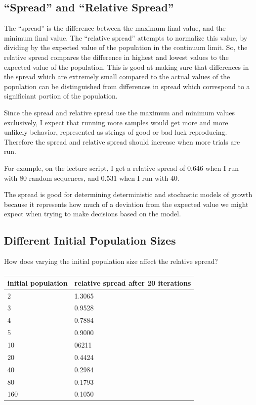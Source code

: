 \documentclass{article}
\begin{document}
\subsection{``Spread'' and ``Relative Spread''}

The ``spread'' is the difference between the maximum final value,
	and the minimum final value.
The ``relative spread'' attempts to normalize this value, by dividing
	by the expected value of the population in the continuum limit.
So, the relative spread compares the difference in highest and lowest values
	to the expected value of the population.
This is good at making sure that differences in the spread which are extremely
	small compared to the actual values of the population can be distinguished
	from differences in spread which correspond to a significiant portion
	of the population.

Since the spread and relative spread use the maximum and minimum values exclusively,
	I expect that running more samples would get more and more unlikely behavior,
	represented as strings of good or bad luck reproducing.
Therefore the spread and relative spread should increase when more trials are run.

For example, on the lecture script, I get a relative spread of 0.646
	when I run with 80 random sequences,
	and 0.531
	when I run with 40.

The spread is good for determining deterministic and stochastic models of growth
	because it represents how much of a deviation from the expected value
	we might expect when trying to make decisions based on the model.

\subsection{Different Initial Population Sizes}

How does varying the initial population size affect the relative spread?

\paragraph{}
\begin{tabular}{|l|l|}
\hline
initial population & relative spread after 20 iterations\\
\hline
2 & 1.3065 \\
\hline
3 & 0.9528 \\
\hline
4 & 0.7884 \\
\hline
5 & 0.9000 \\
\hline
10 & 06211 \\
\hline
20 & 0.4424 \\
\hline
40 & 0.2984 \\
\hline
80 & 0.1793 \\
\hline
160 & 0.1050 \\
\hline
\end{tabular}
\end{document}
